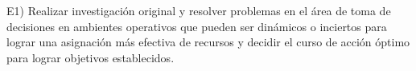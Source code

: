 E1) Realizar investigaci\'{o}n original y resolver problemas en el \'{a}rea de
toma de decisiones en ambientes operativos que pueden ser din\'{a}micos o
inciertos para lograr una asignaci\'{o}n m\'{a}s efectiva de recursos y
decidir el curso de acci\'{o}n \'{o}ptimo para lograr objetivos establecidos.
